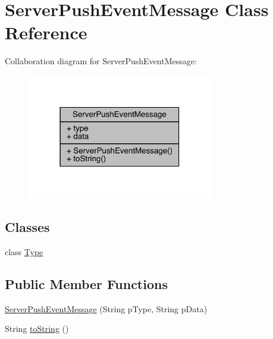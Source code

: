 \hypertarget{classcom_1_1toast_1_1android_1_1gamebase_1_1serverpush_1_1_server_push_event_message}{}\section{Server\+Push\+Event\+Message Class Reference}
\label{classcom_1_1toast_1_1android_1_1gamebase_1_1serverpush_1_1_server_push_event_message}


Collaboration diagram for Server\+Push\+Event\+Message\+:
\nopagebreak
\begin{figure}[H]
\begin{center}
\leavevmode
\includegraphics[width=230pt]{classcom_1_1toast_1_1android_1_1gamebase_1_1serverpush_1_1_server_push_event_message__coll__graph}
\end{center}
\end{figure}
\subsection*{Classes}
\begin{DoxyCompactItemize}
\item 
class \hyperlink{classcom_1_1toast_1_1android_1_1gamebase_1_1serverpush_1_1_server_push_event_message_1_1_type}{Type}
\end{DoxyCompactItemize}
\subsection*{Public Member Functions}
\begin{DoxyCompactItemize}
\item 
\hyperlink{classcom_1_1toast_1_1android_1_1gamebase_1_1serverpush_1_1_server_push_event_message_ac59122f9760aa38ccfec2c3871173fd4}{Server\+Push\+Event\+Message} (String p\+Type, String p\+Data)
\item 
String \hyperlink{classcom_1_1toast_1_1android_1_1gamebase_1_1serverpush_1_1_server_push_event_message_ad146fa8579a5f8a876c4688cc5a68520}{to\+String} ()
\end{DoxyCompactItemize}
